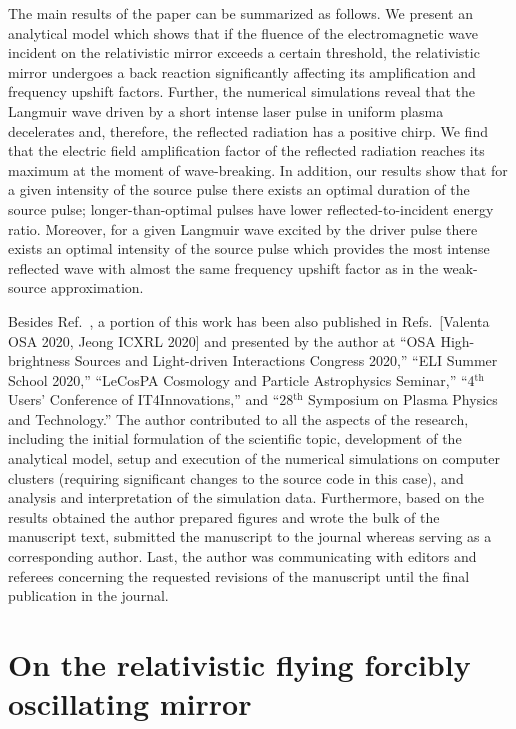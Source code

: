\documentclass[10pt, twoside, a4paper, openright]{report}
\newcommand{\q}[1]{``#1''} %
\begin{document}
The main results of the paper can be summarized as follows. We present an analytical model which shows that if the fluence of the electromagnetic wave incident on the relativistic mirror exceeds a certain threshold, the relativistic mirror undergoes a back reaction significantly affecting its amplification and frequency upshift factors. Further, the numerical simulations reveal that the Langmuir wave driven by a short intense laser pulse in uniform plasma decelerates and, therefore, the reflected radiation has a positive chirp. We find that the electric field amplification factor of the reflected radiation reaches its maximum at the moment of wave-breaking. In addition, our results show that for a given intensity of the source pulse there exists an optimal duration of the source pulse; longer-than-optimal pulses have lower reflected-to-incident energy ratio. Moreover, for a given Langmuir wave excited by the driver pulse there exists an optimal intensity of the source pulse which provides the most intense reflected wave with almost the same frequency upshift factor as in the weak-source approximation.

Besides Ref.~, a portion of this work has been also published in Refs.~[Valenta OSA 2020, Jeong ICXRL 2020] and presented by the author at \q{OSA High-brightness Sources and Light-driven Interactions Congress 2020,} \q{ELI Summer School 2020,} \q{LeCosPA Cosmology and Particle Astrophysics Seminar,} \q{4$ ^{\mathrm{th}} $ Users' Conference of IT4Innovations,} and \q{28$ ^{\mathrm{th}} $ Symposium on Plasma Physics and Technology.} The author contributed to all the aspects of the research, including the initial formulation of the scientific topic, development of the analytical model, setup and execution of the numerical simulations on computer clusters (requiring significant changes to the source code in this case), and analysis and interpretation of the simulation data. Furthermore, based on the results obtained the author prepared figures and wrote the bulk of the manuscript text, submitted the manuscript to the journal whereas serving as a corresponding author. Last, the author was communicating with editors and referees concerning the requested revisions of the manuscript until the final publication in the journal.


\section{On the relativistic flying forcibly oscillating mirror}
%
\end{document}
